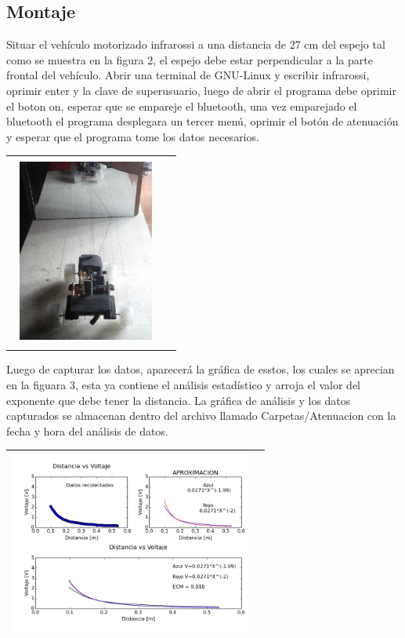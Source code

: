 \documentclass[12]{article}
\newenvironment{Figure}
{\par\medskip\noindent\minipage{\linewidth}}
{\endminipage\par\medskip}
\begin{document}
\begin{multicols}{2}
\subsection{Montaje}
Situar el vehículo motorizado infrarossi a una distancia de 27 cm del espejo tal como se muestra en la figura 2, el espejo debe estar perpendicular a la parte frontal del vehículo. Abrir una terminal de GNU-Linux y escribir infrarossi, oprimir enter y la clave de superusuario, luego de abrir el programa debe oprimir el boton on, esperar que se empareje el bluetooth, una vez emparejado el bluetooth el programa desplegara un tercer menú, oprimir el botón de atenuación y esperar que el programa tome los datos necesarios. 
\begin{Figure}	
\center
\begin{tabular}{|l|r|}
\hline \\
\includegraphics[width=5cm, height=6cm]{img/mon_ate.png} \\\\ \hline
\end{tabular}
\label{fig:g2}
\end{Figure}
Luego de capturar los datos, aparecerá la gráfica de esstos, los cuales se aprecian en la figuara 3, esta ya contiene el análisis estadístico y arroja el valor del exponente que debe tener la distancia. La gráfica de análisis y los datos capturados se almacenan dentro del archivo llamado Carpetas/Atenuacion con la fecha y hora del análisis de datos.
\begin{Figure}	
\center
\begin{tabular}{|l|r|}
\hline
\includegraphics[width=8cm, height=6cm]{img/Atenuacion.png} \\ \hline

\end{tabular}
\end{Figure}
\end{multicols}
\end{document}
